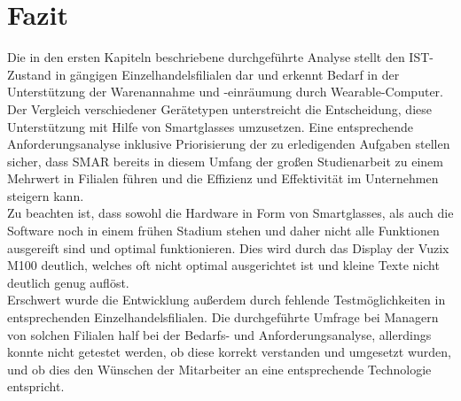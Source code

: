 
\chapter{Fazit}
Die in den ersten Kapiteln beschriebene durchgeführte Analyse stellt den IST-Zustand in gängigen Einzelhandelsfilialen dar und erkennt Bedarf in der Unterstützung der Warenannahme und -einräumung durch Wearable-Computer. Der Vergleich verschiedener Gerätetypen unterstreicht die Entscheidung, diese Unterstützung mit Hilfe von Smartglasses umzusetzen. Eine entsprechende Anforderungsanalyse inklusive Priorisierung der zu erledigenden Aufgaben stellen sicher, dass \ac{SMAR} bereits in diesem Umfang der großen Studienarbeit zu einem Mehrwert in Filialen führen und die Effizienz und Effektivität im Unternehmen steigern kann.\\

Zu beachten ist, dass sowohl die Hardware in Form von Smartglasses, als auch die Software noch in einem frühen Stadium stehen und daher nicht alle Funktionen ausgereift sind und optimal funktionieren. Dies wird \zB durch das Display der Vuzix M100 deutlich, welches oft nicht optimal ausgerichtet ist und kleine Texte nicht deutlich genug auflöst.\\

Erschwert wurde die Entwicklung außerdem durch fehlende Testmöglichkeiten in entsprechenden Einzelhandelsfilialen. Die durchgeführte Umfrage bei Managern von solchen Filialen half bei der Bedarfs- und Anforderungsanalyse, allerdings konnte nicht getestet werden, ob diese korrekt verstanden und umgesetzt wurden, und ob dies den Wünschen der Mitarbeiter an eine entsprechende Technologie entspricht.\\

